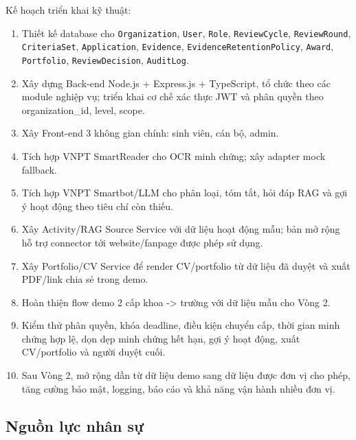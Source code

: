 \endgroup

\noindent Kế hoạch triển khai kỹ thuật:

\begin{enumerate}
    \item Thiết kế database cho \texttt{Organization}, \texttt{User}, \texttt{Role}, \texttt{ReviewCycle}, \texttt{ReviewRound}, \texttt{CriteriaSet}, \texttt{Application}, \texttt{Evidence}, \texttt{EvidenceRetentionPolicy}, \texttt{Award}, \texttt{Portfolio}, \texttt{ReviewDecision}, \texttt{AuditLog}.
    \item Xây dựng Back-end Node.js + Express.js + TypeScript, tổ chức theo các module nghiệp vụ; triển khai cơ chế xác thực JWT và phân quyền theo organization\_id, level, scope.
    \item Xây Front-end 3 không gian chính: sinh viên, cán bộ, admin.
    \item Tích hợp VNPT SmartReader cho OCR minh chứng; xây adapter mock fallback.
    \item Tích hợp VNPT Smartbot/LLM cho phân loại, tóm tắt, hỏi đáp RAG và gợi ý hoạt động theo tiêu chí còn thiếu.
    \item Xây Activity/RAG Source Service với dữ liệu hoạt động mẫu; bản mở rộng hỗ trợ connector tới website/fanpage được phép sử dụng.
    \item Xây Portfolio/CV Service để render CV/portfolio từ dữ liệu đã duyệt và xuất PDF/link chia sẻ trong demo.
    \item Hoàn thiện flow demo 2 cấp khoa -{}> trường với dữ liệu mẫu cho Vòng 2.
    \item Kiểm thử phân quyền, khóa deadline, điều kiện chuyển cấp, thời gian minh chứng hợp lệ, dọn dẹp minh chứng hết hạn, gợi ý hoạt động, xuất CV/portfolio và người duyệt cuối.
    \item Sau Vòng 2, mở rộng dần từ dữ liệu demo sang dữ liệu được đơn vị cho phép, tăng cường bảo mật, logging, báo cáo và khả năng vận hành nhiều đơn vị.
\end{enumerate}

\subsection{Nguồn lực nhân sự}

\begingroup
\small
\setlength{\tabcolsep}{4pt}
\renewcommand{\arraystretch}{1.25}

